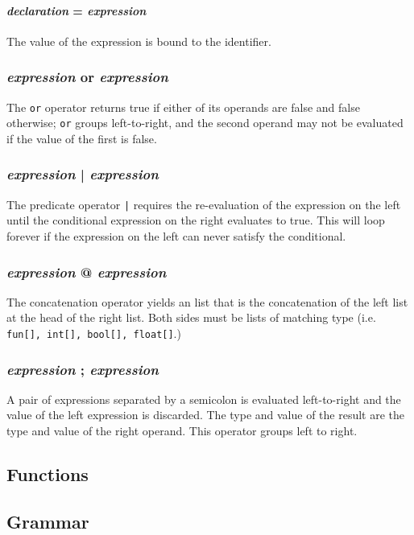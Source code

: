 \paragraph{\textit{declaration} = \textit{expression}}
The value of the expression is bound to the identifier.

\subsubsection{\textit{expression} or \textit{expression}}
The \texttt{or} operator returns true if either of its operands are false and false otherwise; \texttt{or} groups left-to-right, and the second operand may not be evaluated if the value of the first is false.

\subsubsection{\textit{expression} | \textit{expression}}
The predicate operator \texttt{|} requires the re-evaluation of the expression on the left until the conditional expression on the right evaluates to true. This will loop forever if the expression on the left can never satisfy the conditional.

\subsubsection{\textit{expression} @ \textit{expression}} 
The concatenation operator yields an list that is the concatenation of the left list at the head of the right list. Both sides must be lists of matching type (i.e. \texttt{fun[], int[], bool[], float[]}.) 

\subsubsection{\textit{expression} ; \textit{expression}}
A pair of expressions separated by a semicolon is evaluated left-to-right and the value of the left expression is discarded. The type and value of the result are the type and value of the right operand. This operator groups left to right. 
 
\subsection{Functions}

\newpage

\subsection{Grammar}

